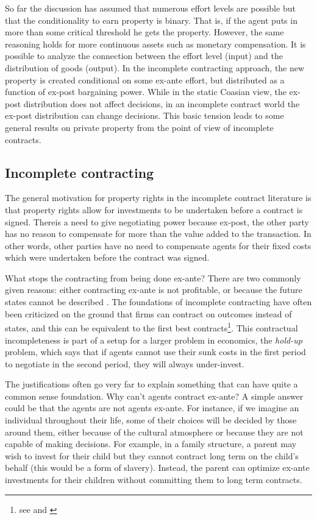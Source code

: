 So far the discussion has assumed that numerous effort levels are possible but that the conditionality to earn property is binary. That is, if the agent puts in more than some critical threshold he gets the property. However, the same reasoning holds for more continuous assets such as monetary compensation. It is possible to analyze the connection between the effort level (input) and the distribution of goods (output). In the incomplete contracting approach, the new property is created conditional on some ex-ante effort, but distributed as a function of ex-post bargaining power. While in the static Coasian view, the ex-post distribution does not affect decisions, in an incomplete contract world the ex-post distribution can change decisions. This basic tension leads to some general results on private property from the point of view of incomplete contracts.

\subsection{Incomplete contracting} \label{incomplete}

The general motivation for property rights in the incomplete contract literature is that property rights allow for investments to be undertaken before a contract is signed. Thereis a need to give negotiating power because ex-post, the other party has no reason to compensate for more than the value added to the transaction. In other words, other parties have no need to compensate agents for their fixed costs which were undertaken before the contract was signed.

What stops the contracting from being done ex-ante? There are two commonly given reasons: either contracting ex-ante is not profitable, or because the future states cannot be described \citep{Hart1999}. The foundations of incomplete contracting have often been criticized on the ground that firms can contract on outcomes instead of states, and this can be equivalent to the first best contracts\footnote{see \cite{Maskin2002} and \cite{maskin1999unforeseen}}. This contractual incompleteness is part of a setup for a larger problem in economics, the \textit{hold-up} problem, which says that if agents cannot use their sunk costs in the first period to negotiate in the second period, they will always under-invest.

The justifications often go very far to explain something that can have quite a common sense foundation. Why can't agents contract ex-ante? A simple answer could be that the agents are not agents ex-ante. For instance, if we imagine an individual throughout their life, some of their choices will be decided by those around them, either because of the cultural atmosphere or because they are not capable of making decisions. For example, in a family structure, a parent may wish to invest for their child but they cannot contract long term on the child's behalf (this would be a form of slavery). Instead, the parent can optimize ex-ante investments for their children without committing them to long term contracts.

